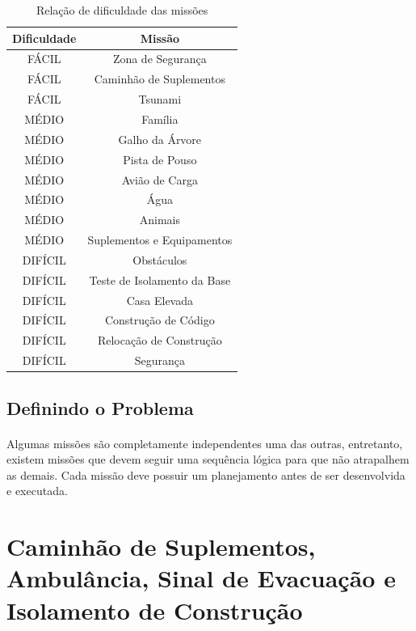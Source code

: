 \documentclass{article}
\begin{document}
		\begin{table}[h!]
			\begin{center}
				\begin{tabular}{cc}
					\toprule
						Dificuldade & Missão\\
					\midrule
						FÁCIL & Zona de Segurança\\
					    FÁCIL & Caminhão de Suplementos\\
					    FÁCIL & Tsunami\\
					    MÉDIO & Família\\
					    MÉDIO & Galho da Árvore\\
					    MÉDIO & Pista de Pouso\\
					    MÉDIO & Avião de Carga\\
					    MÉDIO & Água\\
					    MÉDIO & Animais\\
					    MÉDIO & Suplementos e Equipamentos\\
						DIFÍCIL & Obstáculos\\
					    DIFÍCIL & Teste de Isolamento da Base\\
					    DIFÍCIL & Casa Elevada\\
					    DIFÍCIL & Construção de Código\\
					    DIFÍCIL & Relocação de Construção\\
					    DIFÍCIL & Segurança\\
				    \bottomrule
				\end{tabular}
				\caption{Relação de dificuldade das missões}
				\label{tab:table_dificulty}
			\end{center}
		\end{table}

	\subsection{Definindo o Problema}
		\paragraph{}
			Algumas missões são completamente independentes uma das outras, entretanto, existem missões que devem seguir uma sequência lógica para que não atrapalhem as demais. Cada missão deve possuir um planejamento antes de ser desenvolvida e executada.

\section{Caminhão de Suplementos, Ambulância, Sinal de Evacuação e Isolamento de Construção}
\end{document}
